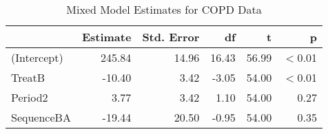 \begin{table}

\caption{Mixed Model Estimates for COPD Data}
\centering
\begin{tabular}[t]{>{}l|rrrrr}
\toprule
 & Estimate & Std. Error & df & t & p\\
\midrule
(Intercept) & 245.84 & 14.96 & 16.43 & 56.99 & $<$0.01\\
TreatB & -10.40 & 3.42 & -3.05 & 54.00 & $<$0.01\\
Period2 & 3.77 & 3.42 & 1.10 & 54.00 & 0.27\\
SequenceBA & -19.44 & 20.50 & -0.95 & 54.00 & 0.35\\
\bottomrule
\end{tabular}
\end{table}
